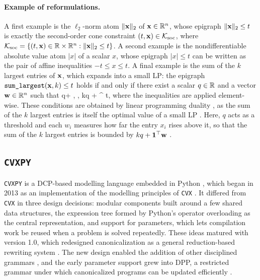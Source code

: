 \paragraph{Example of reformulations.}
A first example is the $\ell_2$-norm atom $\|\mathbf{x}\|_2$ of $\mathbf{x} \in \mathbb{R}^n$, whose
epigraph $\|\mathbf{x}\|_2 \le t$ is exactly the second-order cone constraint
$(t, \mathbf{x}) \in \mathcal{K}_{\mathrm{soc}}$, where
$\mathcal{K}_{\mathrm{soc}} = \{(t, \mathbf{x}) \in \mathbb{R} \times \mathbb{R}^n : \|\mathbf{x}\|_2 \le t\}$.
A second example is the nondifferentiable absolute value atom $|x|$ of a scalar $x$, whose
epigraph $|x| \le t$ can
be written as the pair of affine inequalities $-t \le x \le t$.
A final example is the sum of the $k$ largest entries of $\mathbf{x}$, which expands into a small
\ac{LP}: the epigraph $\texttt{sum\_largest}(\mathbf{x}, k) \le t$ holds if and only if there exist a
scalar $q \in \mathbb{R}$ and a vector $\mathbf{w} \in \mathbb{R}^n$ such that
\BEQ\label{eq:sum-largest}
q\ones +  \ge {}, \qquad {} \ge \zeros, \qquad kq + \ones^\top {} \le t,
\EEQ
where the inequalities are applied element-wise.
These conditions are obtained by linear programming duality \cite{vonneumann1947maximum}, as
the sum of the $k$ largest entries is itself the optimal value of a small
\ac{LP} \cite{boyd2004convex}.
Here, $q$ acts as a threshold and each $w_i$ measures how far the entry $x_i$ rises above it, so that
the sum of the $k$ largest entries is bounded by $kq + \mathbf 1^\top \mathbf{w}$ \cite{boyd2004convex}.

\subsection{\texttt{CVXPY}}\label{sec:canonicalization}

\texttt{CVXPY} is a DCP-based modelling language embedded in Python \cite{diamond2016cvxpy},
which began in 2013 as an implementation of the modelling principles of \texttt{CVX} \cite{cvx}.
It differed from \texttt{CVX} in three design decisions: modular components built around a few
shared data structures, the expression tree formed by Python's operator overloading as the
central representation, and support for parameters, which lets compilation work be reused when
a problem is solved repeatedly.
These ideas matured with version 1.0, which redesigned canonicalization as
a general reduction-based rewriting system \cite{agrawal2018rewriting}.
The new design enabled the addition of other disciplined
grammars \cite{agrawal2019dgp, agrawal2020dqcp, cederberg2025disciplined}, and the early
parameter support grew into \ac{DPP}, a restricted grammar
under which canonicalized programs can be updated efficiently \cite{agrawal2019dpp}.

